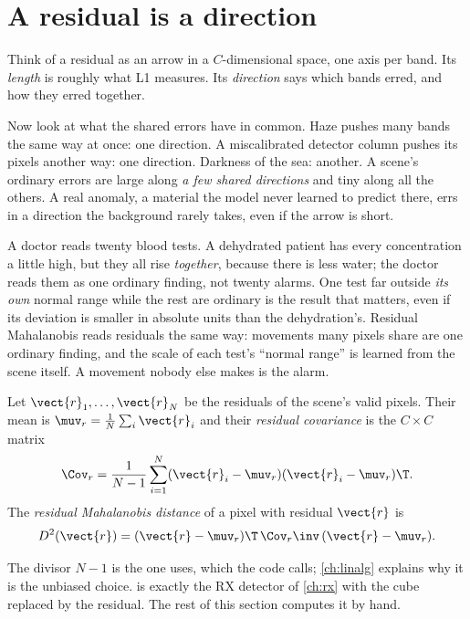 \section{A residual is a direction}\label{sec:residualmaha:direction}

Think of a residual as an arrow in a $C$-dimensional space, one axis per band. Its \emph{length} is roughly
what L1 measures. Its \emph{direction} says which bands erred, and how they erred together.

Now look at what the shared errors have in common. Haze pushes many bands the same way at once: one
direction. A miscalibrated detector column pushes its pixels another way: one direction. Darkness of the sea:
another. A scene's ordinary errors are large along \emph{a few shared directions} and tiny along all the
others. A real anomaly, a material the model never learned to predict there, errs in a direction the
background rarely takes, even if the arrow is short.

\begin{analogy}
A doctor reads twenty blood tests. A dehydrated patient has every concentration a little high, but they all
rise \emph{together}, because there is less water; the doctor reads them as one ordinary finding, not twenty
alarms. One test far outside \emph{its own} normal range while the rest are ordinary is the result that
matters, even if its deviation is smaller in absolute units than the dehydration's. Residual Mahalanobis
reads residuals the same way: movements many pixels share are one ordinary finding, and the scale of each
test's ``normal range'' is learned from the scene itself. A movement nobody else makes is the alarm.
\end{analogy}

\begin{definition}
Let $\vect{r}_1,\dots,\vect{r}_N$ be the residuals of the scene's valid pixels. Their mean is
$\muv_r=\frac1N\sum_i\vect{r}_i$ and their \emph{residual covariance} is the
$C\times C$ matrix
\begin{equation}
\Cov_r=\frac{1}{N-1}\sum_{i=1}^{N}(\vect{r}_i-\muv_r)(\vect{r}_i-\muv_r)\T.
\label{eq:residualmaha:cov}
\end{equation}
The \emph{residual Mahalanobis distance} of a pixel with residual
$\vect{r}$ is
\begin{equation}
D^2(\vect{r})=(\vect{r}-\muv_r)\T\,\Cov_r\inv\,(\vect{r}-\muv_r).
\label{eq:residualmaha:d2}
\end{equation}
\end{definition}
The divisor $N-1$ is the one  uses, which the code calls; \cref{ch:linalg} explains why it is
the unbiased choice.  is exactly the RX detector of \cref{ch:rx} with the cube
replaced by the residual. The rest of this section computes it by hand.

